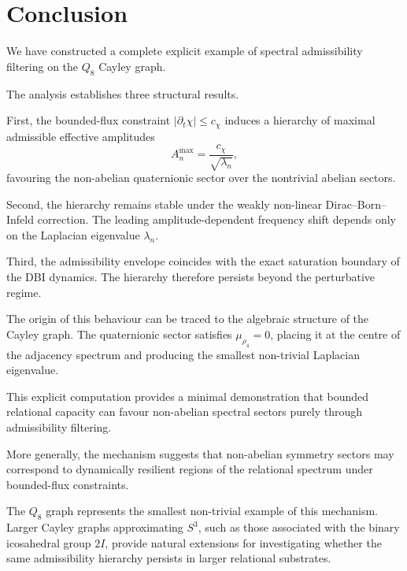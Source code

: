 \section{Conclusion}
  \label{sec:conclusion}

  We have constructed a complete explicit example of spectral
  admissibility filtering on the $Q_8$ Cayley graph.

  The analysis establishes three structural results.

  First, the bounded-flux constraint
  $|\partial_t \chi| \le c_\chi$
  induces a hierarchy of maximal admissible effective amplitudes
  \[
    A_n^{\max} = \frac{c_\chi}{\sqrt{\lambda_n}},
  \]
  favouring the non-abelian quaternionic sector over the
  nontrivial abelian sectors.

  Second, the hierarchy remains stable under the weakly
  non-linear Dirac–Born–Infeld correction.
  The leading amplitude-dependent frequency shift depends
  only on the Laplacian eigenvalue $\lambda_n$.

  Third, the admissibility envelope coincides with the
  exact saturation boundary of the DBI dynamics.
  The hierarchy therefore persists beyond the perturbative
  regime.

  The origin of this behaviour can be traced to the algebraic
  structure of the Cayley graph.
  The quaternionic sector satisfies $\mu_{\rho_4}=0$,
  placing it at the centre of the adjacency spectrum and
  producing the smallest non-trivial Laplacian eigenvalue.

  This explicit computation provides a minimal demonstration
  that bounded relational capacity can favour non-abelian
  spectral sectors purely through admissibility filtering.

  More generally, the mechanism suggests that non-abelian
  symmetry sectors may correspond to dynamically resilient
  regions of the relational spectrum under bounded-flux
  constraints.

  The $Q_8$ graph represents the smallest non-trivial
  example of this mechanism.
  Larger Cayley graphs approximating $S^3$, such as those
  associated with the binary icosahedral group $2I$,
  provide natural extensions for investigating whether
  the same admissibility hierarchy persists in larger
  relational substrates.
